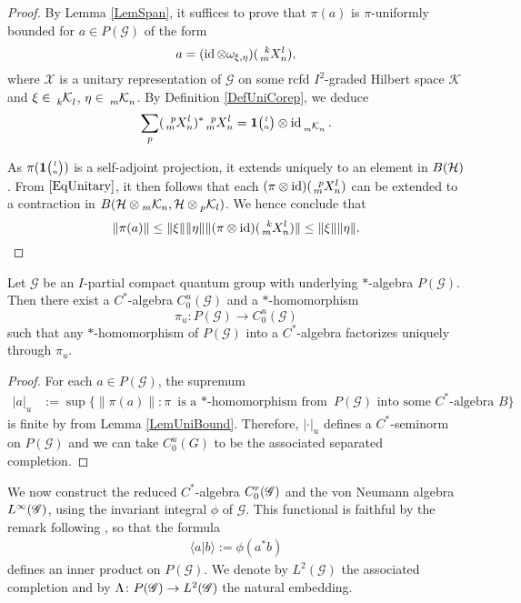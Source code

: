 \begin{proof}
By Lemma \ref{LemSpan}, it suffices to prove that $\pi(a)$ is $\pi$-uniformly bounded for $a\in P(\mathscr{G})$ of the form \[a=(\id \otimes \omega_{\xi,\eta})(\Gr{X}{k}{l}{m}{n}),\]
where $\mathscr{X}$ is a unitary representation of
$\mathscr{G}$ on some rcfd $I^{2}$-graded Hilbert space
$\mathcal{K}$ and $\xi\in \Gru{\mathcal{K}}{k}{l}$, $\eta\in
\Gru{\mathcal{K}}{m}{n}$.  By Definition \ref{DefUniCorep}, we deduce
  \begin{equation}\label{EqUnitary}
    \sum_{p}(\Gr{X}{p}{l}{m}{n})^{*} \Gr{X}{p}{l}{m}{n}  = \UnitC{l}{n}
    \otimes \id_{\Gru{\mathcal{K}}{m}{n}}.
  \end{equation}

As $\pi(\UnitC{l}{n})$ is a self-adjoint projection, it extends uniquely to an element in $B(\Hsp)$. From  $\eqref{EqUnitary}$, it then follows that each $(\pi\otimes \id)(\Gr{X}{p}{l}{m}{n})$ can be extended to a contraction in $B(\Hsp\otimes \GrDA{\mathcal{K}}{m}{n},\Hsp\otimes \GrDA{\mathcal{K}}{p}{l})$. We hence conclude that
 \[\|\pi(a)\| \leq \| \xi\| \|\eta\| \|(\pi \otimes \id)(\Gr{X}{k}{l}{m}{n})\| \leq
    \|\xi\|\|\eta\|. \qedhere \]  
\end{proof} 


\begin{Prop}
Let $\mathscr{G}$ be an $I$-partial compact quantum group with underlying
$*$-algebra $P(\mathscr{G})$. Then
  there exist a $C^{*}$-algebra $C^{u}_{0}(\mathscr{G})$ and a
  $*$-homomorphism \[\pi_{u} \colon P(\mathscr{G}) \to
  C^{u}_{0}(\mathscr{G}) \] such that any $*$-homomorphism of
  $P(\mathscr{G})$ into a $C^{*}$-algebra factorizes uniquely through
  $\pi_{u}$.
\end{Prop}
\begin{proof}
For each $a \in P(\mathscr{G})$, the supremum
\begin{align*} 
  |a|_{u}&:= \sup \{ \|\pi(a)\| : \pi \text{ is a $*$-homomorphism from } P(\mathscr{G})
  \text{ into some $C^{*}$-algebra } B\}
\end{align*}
is finite by from Lemma \ref{LemUniBound}. Therefore, $|\cdot |_{u}$ defines a $C^{*}$-seminorm on
$P(\mathscr{G})$ and we can take $C^{u}_{0}(G)$ to be the associated
separated completion. 
\end{proof}

We now construct the reduced $C^{*}$-algebra $\CrG$ and the von Neumann algebra $\LGinf$, using the invariant integral $\phi$ of  $\mathscr{G}$. This functional is faithful  by the remark following \cite[Corollary 2.16]{DCT1}, so that the formula
\begin{align*}
  \langle a|b\rangle :=\phi(a^{*}b)
\end{align*}
 defines an inner product on $P(\mathscr{G})$.
We denote by $L^{2}(\mathscr{G})$ the associated completion and by
$\Lambda \colon P(\mathscr{G}) \to \LGtwo$ the natural embedding.

